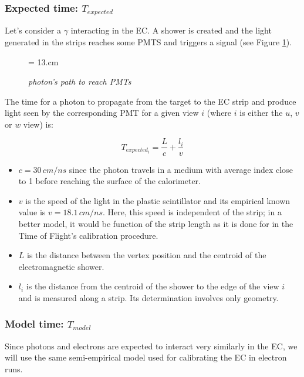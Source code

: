 \documentclass [12pt,letterpaper]{article}
\begin{document}
\subsubsection{Expected time: $T_{expected}$}

Let's consider a $\gamma$ interacting in the EC. A shower is created and the light generated in the strips reaches some PMTS and triggers a signal (see Figure \ref{fig:hit_in_calo}).

\begin{figure} [h]
\begin{center}
\epsfxsize = 13.cm
\caption {\it photon's path to reach PMTs}
\label{fig:hit_in_calo}
\end{center}
\end{figure}

The time for a photon to propagate from the target to the EC strip and produce light seen by the corresponding PMT for a given view $i$ (where $i$ is either the $u$, $v$ or $w$ view) is:

\begin{equation}
T_{expected_{i}} = \frac{ L }{ c } + \frac{ l _{i} }{ v }
\end{equation}

\begin{itemize}
\item $ c = 30 \,cm/ns $ since the photon travels in a medium with average index close to 1 before reaching the surface of the calorimeter.
\item $ v $ is the speed of the light in the plastic scintillator and its empirical known value is $ v = 18.1\,cm/ns $. Here, this speed is independent of the strip; in a better model, it would be function of the strip length as it is done for in the Time of Flight's calibration procedure.  
\item $ L $ is the distance between the vertex position and the centroid of the electromagnetic shower.
\item $ l_{i} $ is the distance from the centroid of the shower to the edge of the view $i$ and is measured along a strip. Its determination involves only geometry.
\end{itemize}

\subsubsection{Model time: $T_{model}$}

Since photons and electrons are expected to interact very similarly in the EC, we will use the same semi-empirical model used for calibrating the EC in electron runs.
 
\end{document}
